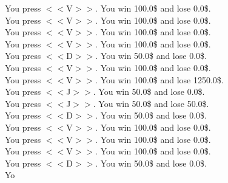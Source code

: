\documentclass[pdflatex,sn-nature]{sn-jnl}%
\theoremstyle{thmstyleone}%
\theoremstyle{thmstyletwo}%
\theoremstyle{thmstylethree}%
\begin{document}
You press $<<$V$>>$. You win 100.0\$ and lose 0.0\$. $~$\\ 
You press $<<$V$>>$. You win 100.0\$ and lose 0.0\$. $~$\\ 
You press $<<$V$>>$. You win 100.0\$ and lose 0.0\$. $~$\\ 
You press $<<$V$>>$. You win 100.0\$ and lose 0.0\$. $~$\\ 
You press $<<$D$>>$. You win 50.0\$ and lose 0.0\$. $~$\\ 
You press $<<$V$>>$. You win 100.0\$ and lose 0.0\$. $~$\\ 
You press $<<$V$>>$. You win 100.0\$ and lose 1250.0\$. $~$\\ 
You press $<<$J$>>$. You win 50.0\$ and lose 0.0\$. $~$\\ 
You press $<<$J$>>$. You win 50.0\$ and lose 50.0\$. $~$\\ 
You press $<<$D$>>$. You win 50.0\$ and lose 0.0\$. $~$\\ 
You press $<<$V$>>$. You win 100.0\$ and lose 0.0\$. $~$\\ 
You press $<<$V$>>$. You win 100.0\$ and lose 0.0\$. $~$\\ 
You press $<<$V$>>$. You win 100.0\$ and lose 0.0\$. $~$\\ 
You press $<<$D$>>$. You win 50.0\$ and lose 0.0\$. $~$\\ 
Yo 
\end{document}
